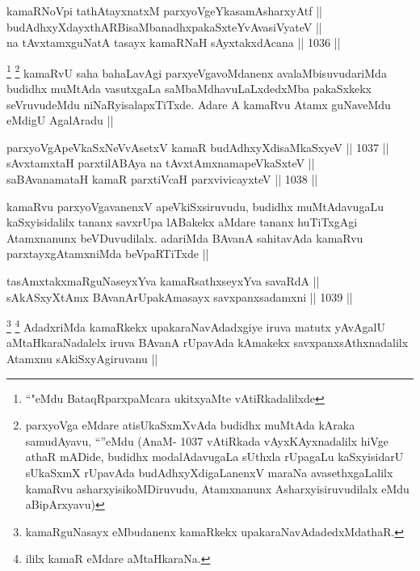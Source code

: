
\begin{shl}
kamaRNoV\s pi tathA\s tayxnatxM parxyoVgeYkasamAsharxyAtf || \\
budAdhxyXdayxthARBisaMbanadhxpakaSxteYvAvasiVyateV || \\
na tAvxtamxguNatA tasayx kamaRNaH sAyxtakxdAcana ||  1036 ||  
\end{shl}

\begin{artha}
\footnote{``\stext"eMdu BataqRparxpaMcara ukitxyaMte vAtiRkadalilxde}
\footnote{parxyoVga eMdare atisUkaSxmXvAda budidhx muMtAda kAraka samudAyavu, ``\stext''eMdu (AnaM- 1037 vAtiRkada vAyxKAyxnadalilx hiVge athaR mADide, budidhx modalAdavugaLa sUthxla rUpagaLu kaSxyisidarU sUkaSxmX rUpavAda budAdhxyXdigaLanenxV maraNa avasethxgaLalilx kamaRvu asharxyisikoMDiruvudu, Atamxnanunx Asharxyisiruvudilalx eMdu aBipArxyavu)}
kamaRvU saha bahaLavAgi parxyeVgavoMdanenx avalaMbisuvudariMda budidhx muMtAda vasutxgaLa saMbaMdhavuLaLxdedxMba pakaSxkekx seVruvudeMdu niNaRyisalapxTiTxde. Adare A kamaRvu Atamx guNaveMdu eMdigU AgalAradu ||
\end{artha}

\begin{shl}
parxyoVgApeVkaSxNeVvA\s \s setxV kamaR budAdhxyXdisaMkaSxyeV ||  1037 || \\
sAvxtamxtaH parxtilABAya na tAvxtAmxnamapeVkaSxteV || \\
saBAvanamataH kamaR parxtiVcaH parxvivicayxteV ||  1038 ||  
\end{shl}

\begin{artha}
kamaRvu parxyoVgavanenxV apeVkiSxsiruvudu, budidhx muMtAdavugaLu kaSxyisidalilx tananx savxrUpa lABakekx aMdare tananx huTiTxgAgi Atamxnanunx beVDuvudilalx. adariMda BAvanA sahitavAda kamaRvu parxtayxgAtamxniMda beVpaRTiTxde ||
\end{artha}

\begin{shl}
tasAmxtakxmaRguNaseyxYva kamaRsathxseyxYva savaRdA || \\
sAkASxyXtAmx BAvanArUpakAmasayx savxpanxsadamxni ||  1039 ||  
\end{shl}

\begin{artha}
\footnote{kamaRguNasayx eMbudanenx kamaRkekx upakaraNavAdadedxMdathaR.}
\footnote{ililx kamaR eMdare aMtaHkaraNa.}
AdadxriMda kamaRkekx upakaraNavAdadxgiye iruva matutx yAvAgalU aMtaHkaraNadalelx iruva BAvanA rUpavAda kAmakekx savxpanxsAthxnadalilx Atamxnu sAkiSxyAgiruvanu ||
\end{artha}

